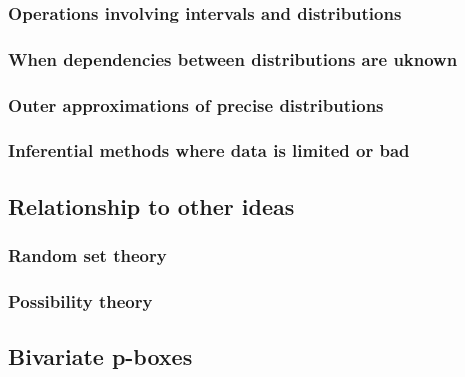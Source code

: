 \documentclass{juliacon}
\begin{document}
\subsubsection{Operations involving intervals and distributions} %

\subsubsection{When dependencies between distributions are uknown} %

\subsubsection{Outer approximations of precise distributions} %

\subsubsection{Inferential methods where data is limited or bad} %


\subsection{Relationship to other ideas}

\subsubsection{Random set theory}

\subsubsection{Possibility theory}




\subsection{Bivariate p-boxes}
\end{document}
